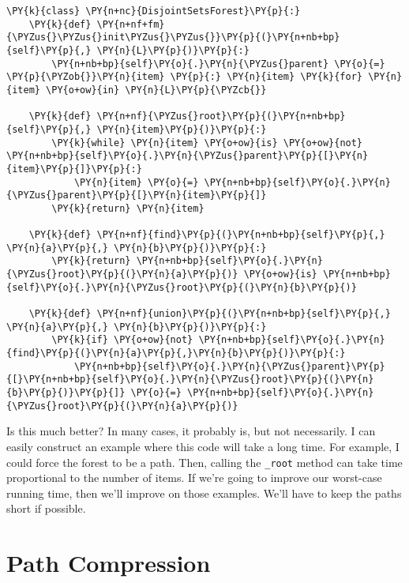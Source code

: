 \begin{Verbatim}[commandchars=\\\{\}]
\PY{k}{class} \PY{n+nc}{DisjointSetsForest}\PY{p}{:}
    \PY{k}{def} \PY{n+nf+fm}{\PYZus{}\PYZus{}init\PYZus{}\PYZus{}}\PY{p}{(}\PY{n+nb+bp}{self}\PY{p}{,} \PY{n}{L}\PY{p}{)}\PY{p}{:}
        \PY{n+nb+bp}{self}\PY{o}{.}\PY{n}{\PYZus{}parent} \PY{o}{=} \PY{p}{\PYZob{}}\PY{n}{item} \PY{p}{:} \PY{n}{item} \PY{k}{for} \PY{n}{item} \PY{o+ow}{in} \PY{n}{L}\PY{p}{\PYZcb{}}

    \PY{k}{def} \PY{n+nf}{\PYZus{}root}\PY{p}{(}\PY{n+nb+bp}{self}\PY{p}{,} \PY{n}{item}\PY{p}{)}\PY{p}{:}
        \PY{k}{while} \PY{n}{item} \PY{o+ow}{is} \PY{o+ow}{not} \PY{n+nb+bp}{self}\PY{o}{.}\PY{n}{\PYZus{}parent}\PY{p}{[}\PY{n}{item}\PY{p}{]}\PY{p}{:}
            \PY{n}{item} \PY{o}{=} \PY{n+nb+bp}{self}\PY{o}{.}\PY{n}{\PYZus{}parent}\PY{p}{[}\PY{n}{item}\PY{p}{]}
        \PY{k}{return} \PY{n}{item}

    \PY{k}{def} \PY{n+nf}{find}\PY{p}{(}\PY{n+nb+bp}{self}\PY{p}{,} \PY{n}{a}\PY{p}{,} \PY{n}{b}\PY{p}{)}\PY{p}{:}
        \PY{k}{return} \PY{n+nb+bp}{self}\PY{o}{.}\PY{n}{\PYZus{}root}\PY{p}{(}\PY{n}{a}\PY{p}{)} \PY{o+ow}{is} \PY{n+nb+bp}{self}\PY{o}{.}\PY{n}{\PYZus{}root}\PY{p}{(}\PY{n}{b}\PY{p}{)}

    \PY{k}{def} \PY{n+nf}{union}\PY{p}{(}\PY{n+nb+bp}{self}\PY{p}{,} \PY{n}{a}\PY{p}{,} \PY{n}{b}\PY{p}{)}\PY{p}{:}
        \PY{k}{if} \PY{o+ow}{not} \PY{n+nb+bp}{self}\PY{o}{.}\PY{n}{find}\PY{p}{(}\PY{n}{a}\PY{p}{,}\PY{n}{b}\PY{p}{)}\PY{p}{:}
            \PY{n+nb+bp}{self}\PY{o}{.}\PY{n}{\PYZus{}parent}\PY{p}{[}\PY{n+nb+bp}{self}\PY{o}{.}\PY{n}{\PYZus{}root}\PY{p}{(}\PY{n}{b}\PY{p}{)}\PY{p}{]} \PY{o}{=} \PY{n+nb+bp}{self}\PY{o}{.}\PY{n}{\PYZus{}root}\PY{p}{(}\PY{n}{a}\PY{p}{)}
\end{Verbatim}



Is this much better? In many cases, it probably is, but not necessarily. I can easily construct an example where this code will take a long time. For example, I could force the forest to be a path. Then, calling the \texttt{\_root} method can take time proportional to the number of items. If we're going to improve our worst-case running time, then we'll improve on those examples. We'll have to keep the paths short if possible.

\section{Path Compression}


